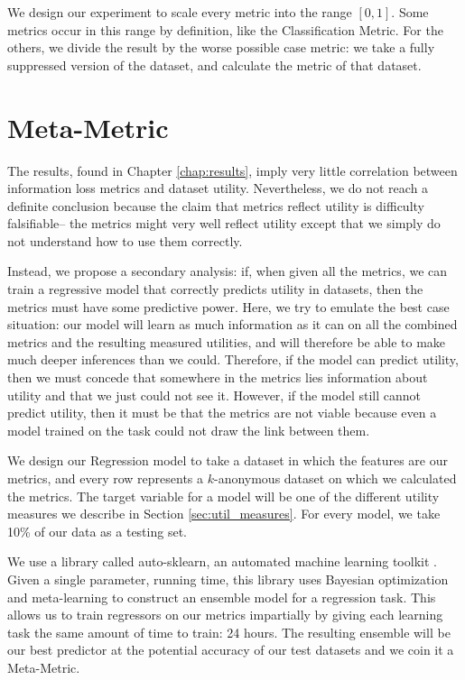 We design our experiment to scale every metric into the range $[0,1]$. Some metrics occur in this range by definition, like the Classification Metric. For the others, we divide the result by the worse possible case metric: we take a fully suppressed version of the dataset, and calculate the metric of that dataset.


\section{Meta-Metric}
\label{sec:metametrics}
The results, found in Chapter \ref{chap:results}, imply very little correlation between information loss metrics and dataset utility. Nevertheless, we do not reach a definite conclusion because the claim that metrics reflect utility is difficulty falsifiable-- the metrics might very well reflect utility except that we simply do not understand how to use them correctly. 

Instead, we propose a secondary analysis: if, when given all the metrics, we can train a regressive model that correctly predicts utility in datasets, then the metrics must have some predictive power. Here, we try to emulate the best case situation: our model will learn as much information as it can on all the combined metrics and the resulting measured utilities, and will therefore be able to make much deeper inferences than we could. Therefore, if the model can predict utility, then we must concede that somewhere in the metrics lies information about utility and that we just could not see it. However, if the model still cannot predict utility, then it must be that the metrics are not viable because even a model trained on the task could not draw the link between them.

We design our Regression model to take a dataset in which the features are our metrics, and every row represents a $k$-anonymous dataset on which we calculated the metrics. The target variable for a model will be one of the different utility measures we describe in Section \ref{sec:util_measures}. For every model, we take 10\% of our data as a testing set.

We use a library called auto-sklearn, an automated machine learning toolkit \cite{autosklearn}. Given a single parameter, running time, this library uses Bayesian optimization and meta-learning to construct an ensemble model for a regression task. This allows us to train regressors on our metrics impartially by giving each learning task the same amount of time to train: 24 hours. The resulting ensemble will be our best predictor at the potential accuracy of our test datasets and we coin it a Meta-Metric. 

